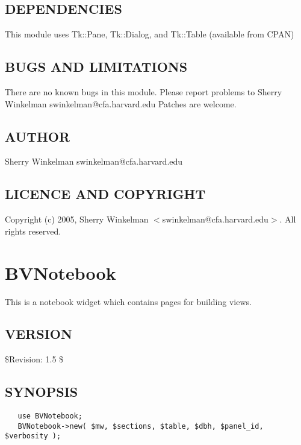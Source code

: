 \documentclass{article}
\begin{document}
\subsection*{DEPENDENCIES\label{BuildView_DEPENDENCIES}}


This module uses Tk::Pane, Tk::Dialog, and Tk::Table (available from CPAN)

\subsection*{BUGS AND LIMITATIONS\label{BuildView_BUGS_AND_LIMITATIONS}}


There are no known bugs in this module.
Please report problems to Sherry Winkelman swinkelman@cfa.harvard.edu
Patches are welcome.

\subsection*{AUTHOR\label{BuildView_AUTHOR}}


Sherry Winkelman swinkelman@cfa.harvard.edu

\subsection*{LICENCE AND COPYRIGHT\label{BuildView_LICENCE_AND_COPYRIGHT}}


Copyright (c) 2005, Sherry Winkelman $<$swinkelman@cfa.harvard.edu$>$. All rights 
reserved.

\clearpage
\section{BVNotebook\label{BVNotebook}}


This is a notebook widget which contains pages for building views.

\subsection*{VERSION\label{BVNotebook_VERSION}}


\$Revision: 1.5 \$

\subsection*{SYNOPSIS\label{BVNotebook_SYNOPSIS}}
\begin{verbatim}
   use BVNotebook;
   BVNotebook->new( $mw, $sections, $table, $dbh, $panel_id, $verbosity );
\end{verbatim}
\end{document}
